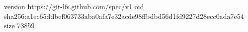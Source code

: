 version https://git-lfs.github.com/spec/v1
oid sha256:a1ec65ddbef063733aba0afa7e32acde98ffbdbd56d1fd9227d28ecc0ada7e54
size 73859
